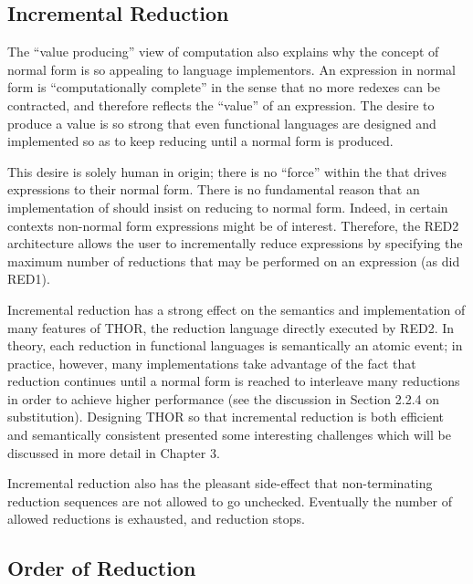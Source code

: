\subsection{Incremental Reduction}

The ``value producing'' view of computation also explains why the concept of
normal form is so appealing to language implementors. An expression in normal
form is ``computationally complete'' in the sense that no more redexes can be
contracted, and therefore reflects the ``value'' of an expression. The desire to
produce a value is so strong that even functional languages are designed and
implemented so as to keep reducing until a normal form is produced.

This desire is solely human in origin; there is no ``force'' within the
\lambdacalculus{} that drives expressions to their normal form. There is no
fundamental reason that an implementation of \lambdacalculus{} should insist on
reducing to normal form. Indeed, in certain contexts non-normal form expressions
might be of interest. Therefore, the RED2 architecture allows the user to
incrementally reduce expressions by specifying the maximum number of reductions
that may be performed on an expression (as did RED1).

Incremental reduction has a strong effect on the semantics and implementation
of many features of THOR, the reduction language directly executed by RED2. In
theory, each reduction in functional languages is semantically an atomic event;
in practice, however, many implementations take advantage of the fact that
reduction continues until a normal form is reached to interleave many reductions
in order to achieve higher performance (see the discussion in Section 2.2.4 on
substitution). Designing THOR so that incremental reduction is both efficient and
semantically consistent presented some interesting challenges which will be
discussed in more detail in Chapter 3.

Incremental reduction also has the pleasant side-effect that non-terminating
reduction sequences are not allowed to go unchecked. Eventually the number of
allowed reductions is exhausted, and reduction stops.

\subsection{Order of Reduction}

